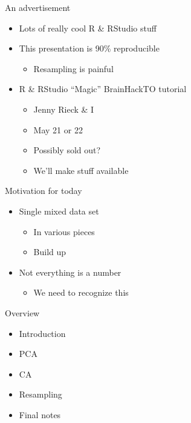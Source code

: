 \documentclass[
  ignorenonframetext,
]{beamer}
\providecommand{\tightlist}{%
  \setlength{\itemsep}{0pt}\setlength{\parskip}{0pt}}
\begin{document}
\begin{frame}{An advertisement}
\protect\hypertarget{an-advertisement}{}

\begin{itemize}[<+->]
\tightlist
\item
  Lots of really cool R \& RStudio stuff
\item
  This presentation is 90\% reproducible

  \begin{itemize}[<+->]
  \tightlist
  \item
    Resampling is painful
  \end{itemize}
\item
  R \& RStudio ``Magic'' BrainHackTO tutorial

  \begin{itemize}[<+->]
  \tightlist
  \item
    Jenny Rieck \& I
  \item
    May 21 or 22
  \item
    Possibly sold out?
  \item
    We'll make stuff available
  \end{itemize}
\end{itemize}

\end{frame}

\begin{frame}{Motivation for today}
\protect\hypertarget{motivation-for-today}{}

\begin{itemize}[<+->]
\tightlist
\item
  Single mixed data set

  \begin{itemize}[<+->]
  \tightlist
  \item
    In various pieces
  \item
    Build up
  \end{itemize}
\item
  Not everything is a number

  \begin{itemize}[<+->]
  \tightlist
  \item
    We need to recognize this
  \end{itemize}
\end{itemize}

\end{frame}

\begin{frame}{Overview}
\protect\hypertarget{overview}{}

\begin{itemize}[<+->]
\tightlist
\item
  Introduction
\item
  PCA
\item
  CA
\item
  Resampling
\item
  Final notes
\end{itemize}

\end{frame}
\end{document}
